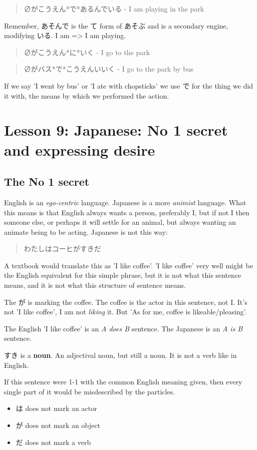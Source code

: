 \documentclass[11pt]{article}
\begin{document}
\begin{quote}
∅がこうえん*で*あるんでいる - I am playing in the park
\end{quote}
Remember, あそんで is the て form of あそぶ and is a secondary engine, modifying いる. I am => I am playing.
\begin{quote}
∅がこうえん*に*いく - I go to the park
\end{quote}
\begin{quote}
∅がバス*で*こうえんいいく - I go to the park by bus
\end{quote}
If we say 'I went by bus' or 'I ate with chopsticks' we use で for the thing we did it with, the means by which we performed the action.
\section{Lesson 9: Japanese: No 1 secret and expressing desire}
\label{sec:orgb786236}
\subsection{The No 1 secret}
\label{sec:org1bc5707}
English is an \emph{ego-centric} language. Japanese is a more \emph{animist} language. What this means is that English always wants a person, preferably I, but if not I then someone else, or perhaps it will settle for an animal, but always wanting an animate being to be acting. Japanese is not this way:
\begin{quote}
わたしはコーヒがすきだ
\end{quote}
A textbook would translate this as 'I like coffee'. 'I like coffee' very well might be the English equivalent for this simple phrase, but it is not what this sentence means, and it is not what this structure of sentence means.

The が is marking the coffee. The coffee is the actor in this sentence, not I. It's not 'I like coffee', I am not \emph{liking} it. But 'As for me, coffee is likeable/pleasing'.

The English 'I like coffee' is an \emph{A does B} sentence. The Japanese is an \emph{A is B} sentence.

すき is a \textbf{noun}. An adjectival noun, but still a noun. It is not a verb like in English.

If this sentence were 1-1 with the common English meaning given, then every single part of it would be misdescribed by the particles.
\begin{itemize}
\item は does not mark an actor
\item が does not mark an object
\item だ does not mark a verb
\end{itemize}
\end{document}
